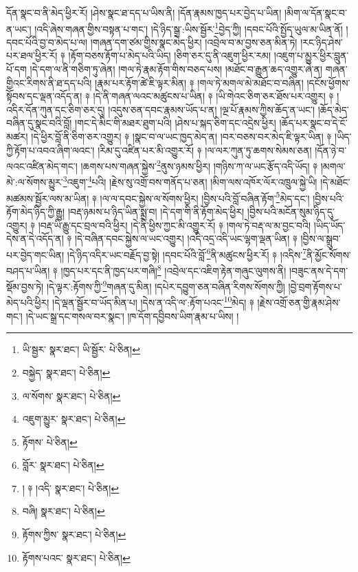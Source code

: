དོན་སྣང་བ་ནི་མེད་ཕྱིར་རོ། །ཤེས་སྣང་ཐ་དད་པ་ཡིས་ནི། །དོན་རྣམས་ཁྱད་པར་བྱེད་པ་ཡིན། །མིག་ལ་དོན་སྣང་བ་ན་ཡང་། །འདི་ཞེས་གཞན་གྱིས་བསྟན་པ་གང་། །དེ་ཉིད་སྒྲ་:ཡིས་སྦྱོར་\footnote{ཡི་སྦྱར་  སྣར་ཐང་། ཡི་སྦྱོར་  པེ་ཅིན། }བྱེད་ཀྱི། །དབང་པོའི་སྤྱོད་ཡུལ་མ་ཡིན་ནོ། །དབང་པོའི་བྱ་བ་མེད་པ་ལ། །གཞན་དག་ཙམ་གྱིས་སྣང་མེད་ཕྱིར། །འབྲེལ་བ་མ་བྱས་ཅན་མིན་ཏེ། །རང་ཉིད་ཤེས་པར་ཐལ་ཕྱིར་རོ། ༈ །རྟོག་བཅས་རྟོག་པ་མེད་པའི་ཡིད། །ཅིག་ཅར་དུ་ནི་འཇུག་ཕྱིར་རམ། །འཇུག་པ་མྱུར་ཕྱིར་བླུན་པོ་དག །དེ་དག་ལ་ནི་གཅིག་ཏུ་ཞེན། །གལ་ཏེ་རྣམ་རྟོག་གིས་བཅད་པས། །མཐོང་བ་རྒྱུན་ཆད་འགྱུར་ཞེ་ན། གཞན་གྱིའང་རིགས་ནི་ཐ་དད་པའི། །རྣམ་པར་རྟོག་ཚེ་ཇི་ལྟར་མིན། ༈ །གལ་ཏེ་མགལ་མེ་མཐོང་བ་བཞིན། །དངོས་ཕྱོགས་སྟོབས་དང་ལྡན་འདོད་ན། ༈ །དེ་ནི་གཞན་ལའང་མཚུངས་པ་ཡིན། ༈ །ཡི་གེའང་ཅིག་ཅར་ཐོས་པར་འགྱུར། ༈ །འདིར་དོན་ཀུན་དང་ཅིག་ཅར་དུ། །འདུས་ཅན་དབང་རྣམས་ཡོད་པ་ན། །ལྔ་པོ་རྣམས་ཀྱིས་ཆོད་ན་ཡང་། །ཆོད་མེད་བཞིན་དུ་སྣང་བའི་བློ། །གང་དེ་མིང་གི་མཐར་ཐུག་པའི། །ཤེས་པ་སྐད་ཅིག་དང་འདྲེས་ཕྱིར། །ཆོད་པར་སྣང་བ་དེ་ངོ་མཚར། །དེ་ཕྱིར་བློ་ནི་ཅིག་ཅར་འགྱུར། ༈ །སྣང་བ་ལ་ཡང་ཁྱད་མེད་ན། །བར་བཅས་བར་མེད་ཇི་ལྟར་ཡིན། ༈ །ཡིད་ཀྱི་རྟོག་པ་འབའ་ཞིག་ལའང་། །རིམ་དུ་འཛིན་པར་མི་འགྱུར་རོ། ༈ །ལ་ལར་ཀུན་ཏུ་ཆགས་སེམས་ཅན། །དོན་ཉེ་བ་ལའང་འཛིན་མེད་གང་། །ཆགས་པས་གཞན་སྐྱེས་\footnote{བསྐྱེད་  སྣར་ཐང་།  པེ་ཅིན། }ནུས་ཉམས་ཕྱིར། །གཉིས་ཀ་ལ་ཡང་རྩོད་འདི་ཡོད། ༈ །མགལ་མེ་:ལ་སོགས་མྱུར་\footnote{ལ་སོགས་  སྣར་ཐང་།  པེ་ཅིན། }འཇུག་\footnote{འཇུག་མྱུར་  སྣར་ཐང་།  པེ་ཅིན། }པའི། །རྗེས་སུ་འགྲོ་བས་གནོད་པ་ཅན། །མིག་ལས་འཁོར་ལོར་འཁྲུལ་སྐྱེ་ཡི། །དེ་མཐོང་མཚམས་སྦྱོར་ལས་མ་ཡིན། ༈ །ལ་ལ་དབང་སྐྱེས་ལ་སོགས་ཕྱིར། །བྱིས་པའི་བློ་བཞིན་རྟོག་\footnote{རྟོགས་  པེ་ཅིན། }མེད་དང་། །བྱིས་པའི་རྟོག་མེད་ཉིད་ཀྱི་རྒྱུ། །བརྡ་ཉམས་པ་ཉིད་ཡིན་སྨྲ་བ། །དེ་དག་གི་ནི་རྟོག་མེད་ཕྱིར། །བྱིས་པའི་མངོན་སུམ་ཉིད་དུ་འགྱུར། ༈ །བརྡ་ཡི་རྒྱུ་དང་བྲལ་བའི་ཕྱིར། །དེ་ནི་ཕྱིས་ཀྱང་མི་འགྱུར་རོ། ༈ །གལ་ཏེ་བརྡ་ལ་མ་བྱང་བའི། །ཡིད་ཡོད་དེས་ན་དེ་འདོད་ན། ༈ །དེ་བཞིན་དབང་སྐྱེས་ལ་ཡང་འགྱུར། །འདི་འདྲ་འདི་ཡང་ལྷག་ལྡན་ཡིན། ༈ །བྱིས་ལ་སྒྲུབ་པར་བྱེད་གང་ཡིན། །དེ་ཉིད་འདིར་ཡང་བརྗོད་བྱ་སྟེ། །དབང་པོའི་བློ་\footnote{བློར་  སྣར་ཐང་།  པེ་ཅིན། }ནི་མཚུངས་ཕྱིར་རོ། ༈ །འདིས་\footnote{། ༈ །འདི་  སྣར་ཐང་།  པེ་ཅིན། }ནི་མྱོང་སོགས་བཤད་པ་ཡིན། ༈ །ཁྱད་པར་དང་ནི་ཁྱད་པར་གཞི།\footnote{བཞི།  སྣར་ཐང་།  པེ་ཅིན། } །འབྲེལ་དང་འཇིག་རྟེན་གཞུང་ལུགས་ནི། །བཟུང་ནས་དེ་དག་སྡོམ་བྱས་ཏེ། །དེ་ལྟར་:རྟོགས་ཀྱི་\footnote{རྟོགས་ཀྱིས་  སྣར་ཐང་།  པེ་ཅིན། }གཞན་དུ་མིན། །དཔེར་དབྱུག་ཅན་བཞིན་རིགས་སོགས་ཀྱི། །བྱེ་བྲག་རྟོགས་པ་མེད་པའི་ཕྱིར། །དེ་ལྡན་སྦྱོར་བ་ཡོད་མིན་པ། །དེས་ན་འདི་ལ་:རྟོག་པའང་\footnote{རྟོགས་པའང་  སྣར་ཐང་།  པེ་ཅིན། }མེད། ༈ །རྗེས་འགྲོ་ཅན་གྱི་རྣམ་ཤེས་གང་། །དེ་ཡང་སྒྲ་དང་གསལ་བར་སྣང་། །ཁ་དོག་དབྱིབས་ཡིག་རྣམ་པ་ཡིས། །
